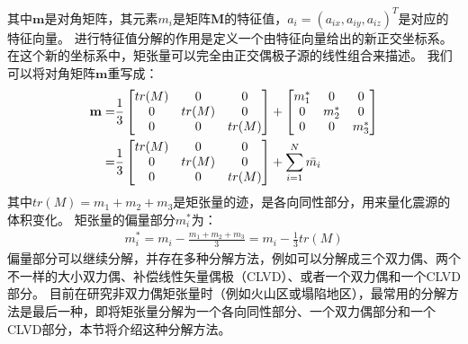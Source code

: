 其中$\mathbf{m}$是对角矩阵，其元素$m_i$是矩阵$\mathbf{M}$的特征值，$a_i = {(a_{ix},a_{iy},a_{iz})}^T$是对应的特征向量。
进行特征值分解的作用是定义一个由特征向量给出的新正交坐标系。
在这个新的坐标系中，矩张量可以完全由正交偶极子源的线性组合来描述。
我们可以将对角矩阵$\mathbf{m}$重写成：
\begin{align}
    \mathbf{m}
    = & \frac{1}{3}
    \begin{bmatrix}
        tr(M) & 0 & 0 \\
        0 & tr(M) & 0 \\
        0 & 0 & tr(M) \\
    \end{bmatrix}
    +
    \begin{bmatrix}
        m_{1}^* & 0 & 0 \\
        0 & m_{2}^* & 0 \\
        0 & 0 & m_{3}^* \\
    \end{bmatrix} \notag \\
    = & \frac{1}{3}
    \begin{bmatrix}
        tr(M) & 0 & 0 \\
        0 & tr(M) & 0 \\
        0 & 0 & tr(M) \\
    \end{bmatrix}
    + \sum_{i=1}^{N} \bar{m_i}
    \label{equ:m-iso-dev}
\end{align}
其中$tr(M)=m_1+m_2+m_3$是矩张量的迹，是各向同性部分，用来量化震源的体积变化。
矩张量的偏量部分$m_i^*$为：
\begin{align}
    m_i^* = m_i - \frac{m_1+m_2+m_3}{3} = m_i - \frac{1}{3}tr(M)
\end{align}
偏量部分可以继续分解，并存在多种分解方法，例如可以分解成三个双力偶、两个不一样的大小双力偶、补偿线性矢量偶极（CLVD）、或者一个双力偶和一个CLVD部分。
目前在研究非双力偶矩张量时（例如火山区或塌陷地区），最常用的分解方法是最后一种，即将矩张量分解为一个各向同性部分、一个双力偶部分和一个CLVD部分，本节将介绍这种分解方法。


